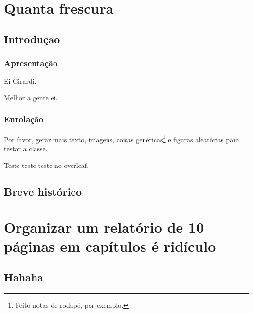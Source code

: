 \documentclass[12pt,openright,oneside,a4paper,english,brazil,oficial]{iaeRT}
\begin{document}
\chapter{Quanta frescura}

\section{Introdução}

\subsection{Apresentação}
Ei Girardi.

Melhor a gente ei.

\subsection{Enrolação}
Por favor, gerar mais texto, imagens, coisas genéricas\footnote{Feito notas de rodapé, por exemplo.} e figuras aleatórias para testar a classe.

Teste teste teste no overleaf.

\section{Breve histórico}

\lipsum[0-12]

\chapter{Organizar um relatório de 10 páginas em capítulos é ridículo}

\section{Hahaha}
%

\postextual

\begin{apendicesenv}

%

%

%

%

%

%

\end{apendicesenv}


\end{document}
